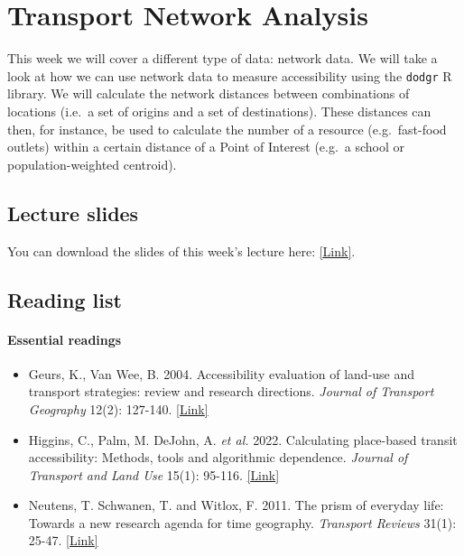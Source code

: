 \documentclass[
  letterpaper,
  DIV=11,
  numbers=noendperiod]{scrreprt}
\providecommand{\tightlist}{%
  \setlength{\itemsep}{0pt}\setlength{\parskip}{0pt}}\usepackage{longtable,booktabs,array}
\begin{document}

\hypertarget{transport-network-analysis}{%
\chapter{Transport Network Analysis}\label{transport-network-analysis}}

This week we will cover a different type of data: network data. We will
take a look at how we can use network data to measure accessibility
using the \texttt{dodgr} R library. We will calculate the network
distances between combinations of locations (i.e.~a set of origins and a
set of destinations). These distances can then, for instance, be used to
calculate the number of a resource (e.g.~fast-food outlets) within a
certain distance of a Point of Interest (e.g.~a school or
population-weighted centroid).

\hypertarget{lecture-w08}{%
\section{Lecture slides}\label{lecture-w08}}

You can download the slides of this week's lecture here:
\href{https://github.com/jtvandijk/GEOG0114Q/tree/master/slides/w08-psa.pdf}{{[}Link{]}}.

\hypertarget{reading-w08}{%
\section{Reading list}\label{reading-w08}}

\hypertarget{essential-readings-1}{%
\subsubsection*{Essential readings}\label{essential-readings-1}}

\begin{itemize}
\tightlist
\item
  Geurs, K., Van Wee, B. 2004. Accessibility evaluation of land-use and
  transport strategies: review and research directions. \emph{Journal of
  Transport Geography} 12(2): 127-140.
  \href{https://doi.org/10.1016/j.jtrangeo.2003.10.005}{{[}Link{]}}
\item
  Higgins, C., Palm, M. DeJohn, A. \emph{et al.} 2022. Calculating
  place-based transit accessibility: Methods, tools and algorithmic
  dependence. \emph{Journal of Transport and Land Use} 15(1): 95-116.
  \href{https://doi.org/10.5198/jtlu.2022.2012}{{[}Link{]}}
\item
  Neutens, T. Schwanen, T. and Witlox, F. 2011. The prism of everyday
  life: Towards a new research agenda for time geography.
  \emph{Transport Reviews} 31(1): 25-47.
  \href{https://doi.org/10.1080/01441647.2010.484153}{{[}Link{]}}
\end{itemize}
\end{document}
